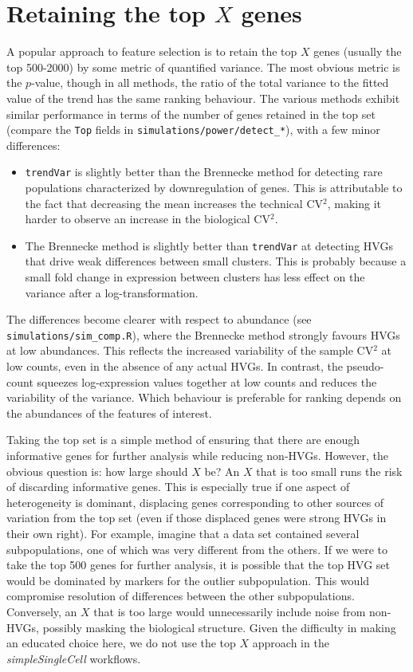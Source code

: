 \documentclass{article}
\newcommand\code[1]{{\small\texttt{#1}}}
\begin{document}
\section{Retaining the top $X$ genes}
A popular approach to feature selection is to retain the top $X$ genes (usually the top 500-2000) by some metric of quantified variance.
The most obvious metric is the $p$-value, though in all methods, the ratio of the total variance to the fitted value of the trend has the same ranking behaviour.
The various methods exhibit similar performance in terms of the number of genes retained in the top set
(compare the \code{Top} fields in \texttt{simulations/power/detect\_*}), with a few minor differences:
\begin{itemize}
\item \code{trendVar} is slightly better than the Brennecke method for detecting rare populations characterized by downregulation of genes.
This is attributable to the fact that decreasing the mean increases the technical CV$^2$, making it harder to observe an increase in the biological CV$^2$.
\item The Brennecke method is slightly better than \code{trendVar} at detecting HVGs that drive weak differences between small clusters.
This is probably because a small fold change in expression between clusters has less effect on the variance after a log-transformation.
\end{itemize}
The differences become clearer with respect to abundance (see \texttt{simulations/sim\_comp.R}), where the Brennecke method strongly favours HVGs at low abundances.
This reflects the increased variability of the sample CV$^2$ at low counts, even in the absence of any actual HVGs.
In contrast, the pseudo-count squeezes log-expression values together at low counts and reduces the variability of the variance.
Which behaviour is preferable for ranking depends on the abundances of the features of interest.

Taking the top set is a simple method of ensuring that there are enough informative genes for further analysis while reducing non-HVGs.
However, the obvious question is: how large should $X$ be?
An $X$ that is too small runs the risk of discarding informative genes.
This is especially true if one aspect of heterogeneity is dominant, displacing genes corresponding to other sources of variation from the top set
(even if those displaced genes were strong HVGs in their own right).
For example, imagine that a data set contained several subpopulations, one of which was very different from the others.
If we were to take the top 500 genes for further analysis, 
it is possible that the top HVG set would be dominated by markers for the outlier subpopulation.
This would compromise resolution of differences between the other subpopulations. 
Conversely, an $X$ that is too large would unnecessarily include noise from non-HVGs, 
possibly masking the biological structure.
Given the difficulty in making an educated choice here, we do not use the top $X$ approach in the \textit{simpleSingleCell} workflows.
\end{document}

